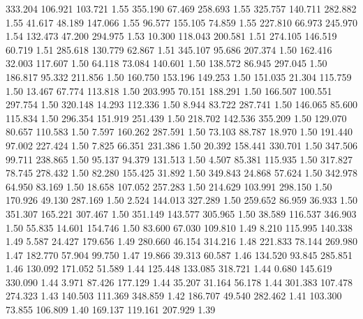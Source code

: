  333.204  106.921  103.721         1.55
 355.190   67.469  258.693         1.55
 325.757  140.711  282.882         1.55
  41.617   48.189  147.066         1.55
  96.577  155.105   74.859         1.55
 227.810   66.973  245.970         1.54
 132.473   47.200  294.975         1.53
  10.300  118.043  200.581         1.51
 274.105  146.519   60.719         1.51
 285.618  130.779   62.867         1.51
 345.107   95.686  207.374         1.50
 162.416   32.003  117.607         1.50
  64.118   73.084  140.601         1.50
 138.572   86.945  297.045         1.50
 186.817   95.332  211.856         1.50
 160.750  153.196  149.253         1.50
 151.035   21.304  115.759         1.50
  13.467   67.774  113.818         1.50
 203.995   70.151  188.291         1.50
 166.507  100.551  297.754         1.50
 320.148   14.293  112.336         1.50
   8.944   83.722  287.741         1.50
 146.065   85.600  115.834         1.50
 296.354  151.919  251.439         1.50
 218.702  142.536  355.209         1.50
 129.070   80.657  110.583         1.50
   7.597  160.262  287.591         1.50
  73.103   88.787   18.970         1.50
 191.440   97.002  227.424         1.50
   7.825   66.351  231.386         1.50
  20.392  158.441  330.701         1.50
 347.506   99.711  238.865         1.50
  95.137   94.379  131.513         1.50
   4.507   85.381  115.935         1.50
 317.827   78.745  278.432         1.50
  82.280  155.425   31.892         1.50
 349.843   24.868   57.624         1.50
 342.978   64.950   83.169         1.50
  18.658  107.052  257.283         1.50
 214.629  103.991  298.150         1.50
 170.926   49.130  287.169         1.50
   2.524  144.013  327.289         1.50
 259.652   86.959   36.933         1.50
 351.307  165.221  307.467         1.50
 351.149  143.577  305.965         1.50
  38.589  116.537  346.903         1.50
  55.835   14.601  154.746         1.50
  83.600   67.030  109.810         1.49
   8.210  115.995  140.338         1.49
   5.587   24.427  179.656         1.49
 280.660   46.154  314.216         1.48
 221.833   78.144  269.980         1.47
 182.770   57.904   99.750         1.47
  19.866   39.313   60.587         1.46
 134.520   93.845  285.851         1.46
 130.092  171.052   51.589         1.44
 125.448  133.085  318.721         1.44
   0.680  145.619  330.090         1.44
   3.971   87.426  177.129         1.44
  35.207   31.164   56.178         1.44
 301.383  107.478  274.323         1.43
 140.503  111.369  348.859         1.42
 186.707   49.540  282.462         1.41
 103.300   73.855  106.809         1.40
 169.137  119.161  207.929         1.39
